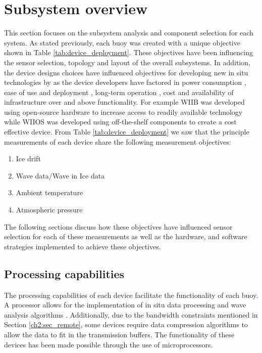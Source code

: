 \section{Subsystem overview}

This section focuses on the subsystem analysis and component selection for each system. As stated previously, each buoy was created with a unique objective shown in Table \ref{tab:device_deployment}. These objectives have been influencing the sensor selection, topology and layout of the overall subsystems. In addition, the device designs choices have influenced objectives for developing new in situ technologies by \textcite{kennicutt2016delivering} as the device developers have factored in power consumption \cite{kohout2015device}, ease of use and deployment \cite{rabault2019open}, long-term operation \cite{doble2017robust}, cost \cite{planck2019evolution,rabault2019open} and availability of infrastructure \cite{doble2017robust} over and above functionality. For example WIIB was developed using open-source hardware \cite{rabault2019open} to increase access to readily available technology while WIIOS was developed using off-the-shelf components \cite{kohout2015device} to create a cost effective device. From Table \ref{tab:device_deployment} we saw that the principle measurements of each device share the following measurement objectives:

\begin{enumerate}
	\item Ice drift
	\item Wave data/Wave in Ice data
	\item Ambient temperature
	\item Atmospheric pressure 
\end{enumerate}

The following sections discuss how these objectives have influenced sensor selection for each of these measurements as well as the hardware, and software strategies implemented to achieve these objectives.

\subsection{Processing capabilities}

The processing capabilities of each device facilitate the functionality of each buoy. A processor allows for the implementation of in situ data processing and wave analysis algorithms \cite{kohout2015device,rabault2019open}. Additionally, due to the bandwidth constraints mentioned in Section \ref{ch2:sec_remote}, some devices require data compression algorithms to allow the data to fit in the transmission buffers. The functionality of these devices has been made possible through the use of microprocessors.

